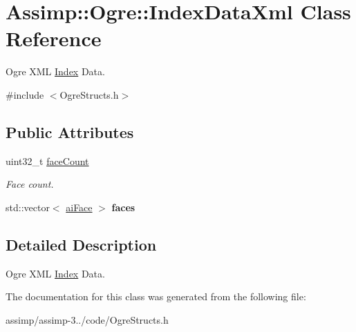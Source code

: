 \hypertarget{class_assimp_1_1_ogre_1_1_index_data_xml}{\section{Assimp\+:\+:Ogre\+:\+:Index\+Data\+Xml Class Reference}
\label{class_assimp_1_1_ogre_1_1_index_data_xml}
}


Ogre X\+M\+L \hyperlink{struct_index}{Index} Data.  




{\ttfamily \#include $<$Ogre\+Structs.\+h$>$}

\subsection*{Public Attributes}
\begin{DoxyCompactItemize}
\item 
\hypertarget{class_assimp_1_1_ogre_1_1_index_data_xml_a0669e8ef6590804c15670353b0adc418}{uint32\+\_\+t \hyperlink{class_assimp_1_1_ogre_1_1_index_data_xml_a0669e8ef6590804c15670353b0adc418}{face\+Count}}\label{class_assimp_1_1_ogre_1_1_index_data_xml_a0669e8ef6590804c15670353b0adc418}

\begin{DoxyCompactList}\small\item\em Face count. \end{DoxyCompactList}\item 
\hypertarget{class_assimp_1_1_ogre_1_1_index_data_xml_a2eb19167465a511a87c9ffce8cc014e0}{std\+::vector$<$ \hyperlink{structai_face}{ai\+Face} $>$ {\bfseries faces}}\label{class_assimp_1_1_ogre_1_1_index_data_xml_a2eb19167465a511a87c9ffce8cc014e0}

\end{DoxyCompactItemize}


\subsection{Detailed Description}
Ogre X\+M\+L \hyperlink{struct_index}{Index} Data. 

The documentation for this class was generated from the following file\+:\begin{DoxyCompactItemize}
\item 
assimp/assimp-\/3../code/Ogre\+Structs.\+h\end{DoxyCompactItemize}
